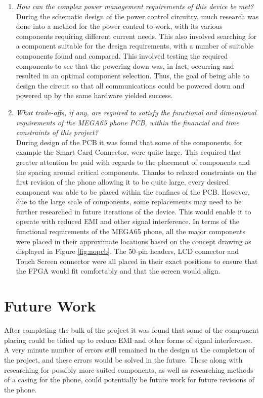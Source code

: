 \begin{enumerate}
\item \textit{How can the complex power management requirements of this device be met?}\\

	During the schematic design of the power control circuitry, much research was done into a method for the power control to work, with its various components requiring different current needs. 
This also involved searching for a component suitable for the design requirements, with a number of suitable components found and compared. 
This involved testing the required components to see that the powering down was, in fact, occurring and resulted in an optimal component selection. 
Thus, the goal of being able to design the circuit so that all communications could be powered down and powered up by the same hardware yielded success.\\
	
\item \textit{What trade-offs, if any, are required to satisfy the functional and dimensional requirements of the MEGA65 phone PCB, within the financial and time constraints of this project?}\\

	During design of the PCB it was found that some of the components, for example the Smart Card Connector, were quite large. 
This required that greater attention be paid with regards to the placement of components and the spacing around critical components. 
Thanks to relaxed constraints on the first revision of the phone allowing it to be quite large, every desired component was able to be placed within the confines of the PCB. 
However, due to the large scale of components, some replacements may need to be further researched in future iterations of the device. 
This would enable it to operate with reduced EMI and other signal interference.
In terms of the functional requirements of the MEGA65 phone, all the major components were placed in their approximate locations based on the concept drawing as displayed in Figure \ref{fig:nopcb}. 
The 50-pin headers, LCD connector and Touch Screen connector were all placed in their exact positions to ensure that the FPGA would fit comfortably and that the screen would align.\\

\end{enumerate}

\section{Future Work}
\label{chap7sec4}

	After completing the bulk of the project it was found that some of the component placing could be tidied up to reduce EMI and other forms of signal interference. 
A very minute number of errors still remained in the design at the completion of the project, and these errors would be solved in the future.
These along with researching for possibly more suited components, as well as researching methods of a casing for the phone, could potentially be future work for future revisions of the phone. 



